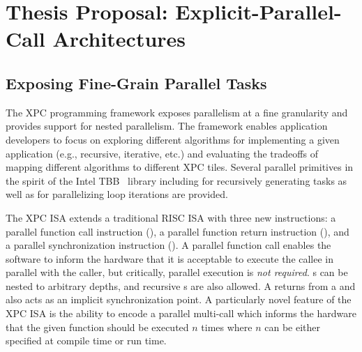 
\section{Thesis Proposal: Explicit-Parallel-Call Architectures}
\label{sec-xpc}

\begin{figure}[t]
  \begin{minipage}[b]{0.42\tw}
    
  \end{minipage}%
  \hfill%
  \begin{minipage}[b]{0.56\tw}
    
  \end{minipage}
\end{figure}


\subsection{Exposing Fine-Grain Parallel Tasks}

The XPC programming framework exposes parallelism at a fine granularity
and provides support for nested parallelism. The framework enables
application developers to focus on exploring different algorithms for
implementing a given application (e.g., recursive, iterative, etc.) and
evaluating the tradeoffs of mapping different algorithms to different XPC
tiles. Several parallel primitives in the spirit of the Intel
TBB~\cite{reinders-tbb-book2007} library including 
for recursively generating tasks as well as  for
parallelizing loop iterations are provided.

The XPC ISA extends a traditional RISC ISA with three new instructions: a
parallel function call instruction (), a parallel function
return instruction (), and a parallel synchronization
instruction (). A parallel function call enables the software
to inform the hardware that it is acceptable to execute the callee in
parallel with the caller, but critically, parallel execution is \emph{not
  required}. s can be nested to arbitrary depths, and recursive
s are also allowed.  A  returns from a  and
also acts as an implicit synchronization point. A particularly novel
feature of the XPC ISA is the ability to encode a parallel multi-call
which informs the hardware that the given function should be executed $n$
times where $n$ can be either specified at compile time or run time.

